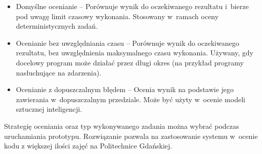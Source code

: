 \begin{itemize}
    \item Domyślne ocenianie -- Porównuje wynik do oczekiwanego rezultatu i~bierze pod uwagę limit czasowy wykonania. Stosowany w~ramach oceny deterministycznych zadań.
    \item Ocenianie bez uwzględniania czasu -- Porównuje wynik do oczekiwanego rezultatu, bez uwzględnienia maksymalnego czasu wykonania. Używany, gdy docelowy program może działać przez długi okres (na przykład programy nasłuchujące na zdarzenia).
    \item Ocenianie z dopuszczalnym błędem -- Ocenia wynik na podstawie jego zawierania w~dopuszczalnym przedziale. Może być użyty w~ocenie modeli sztucznej inteligencji.
\end{itemize}
Strategię oceniania oraz typ wykonywanego zadania można wybrać podczas uruchamiania prototypu. Rozwiązanie pozwala na zastosowanie systemu w~ocenie kodu z większej ilości zajęć na Politechnice Gdańskiej.